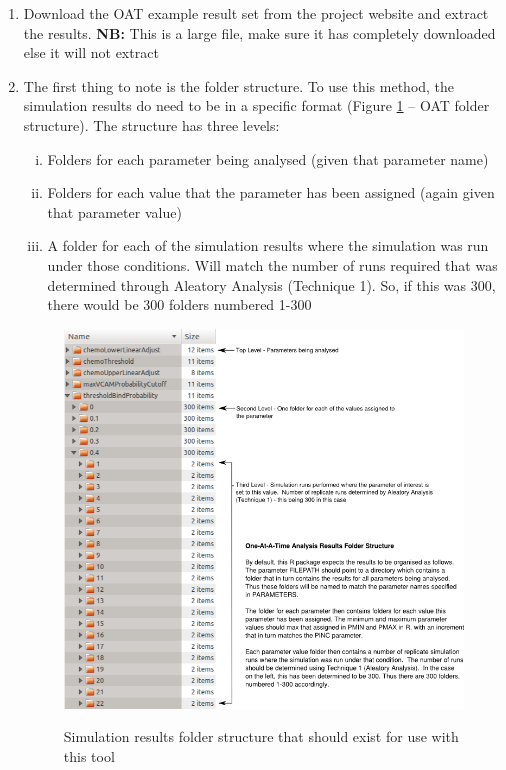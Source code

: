 \documentclass[a4paper,11pt]{article}
\begin{document}
\begin{enumerate}
\item Download the OAT example result set from the project website and extract the results. \textbf{NB:} This is a large file, make sure it has completely downloaded else it will not extract
\item The first thing to note is the folder structure.  To use this method, the simulation results do need to be in a specific format (Figure \ref{OAT_Folders} – OAT folder structure).  The structure has three levels:
\begin{enumerate}[(i)]
\item Folders for each parameter being analysed (given that parameter name)
\item Folders for each value that the parameter has been assigned (again given that parameter value)
\item A folder for each of the simulation results where the simulation was run under those conditions. Will match the number of runs required that was determined through Aleatory Analysis (Technique 1). So, if this was 300, there would be 300 folders numbered 1-300
\end{enumerate}

\begin{figure}
\centering
    \includegraphics[width=\textwidth]{OAT_Folder_Struc.png}\\ \noindent
    \caption{Simulation results folder structure that should exist for use with this tool}
    \label{OAT_Folders}
    \newpage 
\end{figure}


\end{enumerate}
\end{document}
